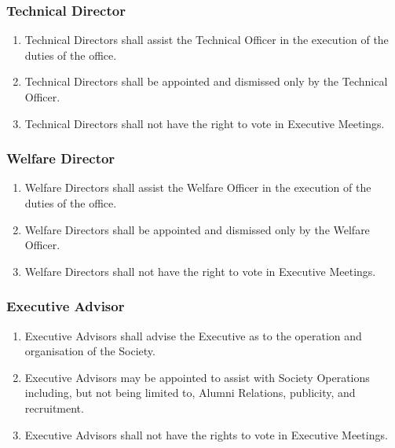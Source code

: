 \documentclass{scrartcl}
\begin{document}
            \subsubsection{Technical Director}
                \label{executive--positions--technical-director}
                \begin{enumerate}
                    \item Technical Directors shall assist the Technical Officer in the execution of the duties of the office.
                    \item Technical Directors shall be appointed and dismissed only by the Technical Officer.
                    \item Technical Directors shall not have the right to vote in Executive Meetings.
                \end{enumerate}

            \subsubsection{Welfare Director}
                \label{executive--positions--welfare-director}
                \begin{enumerate}
                    \item Welfare Directors shall assist the Welfare Officer in the execution of the duties of the office.
                    \item Welfare Directors shall be appointed and dismissed only by the Welfare Officer.
                    \item Welfare Directors shall not have the right to vote in Executive Meetings.
                \end{enumerate}

            \subsubsection{Executive Advisor}
                \label{executive--positions--advisor}
                \begin{enumerate}
                    \item Executive Advisors shall advise the Executive as to the operation and organisation of the Society.
                    \item Executive Advisors may be appointed to assist with Society Operations including, but not being limited to, Alumni Relations, publicity, and recruitment.
                    \item Executive Advisors shall not have the rights to vote in Executive Meetings.
                \end{enumerate}
\end{document}

